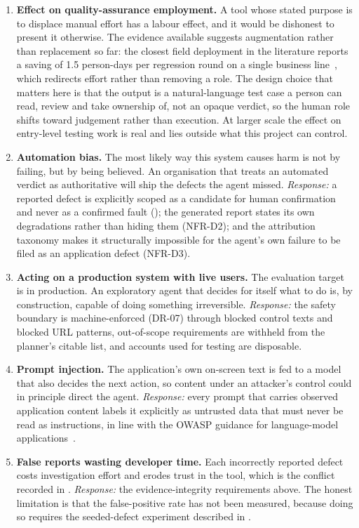 \begin{enumerate}[label=\textbf{N\arabic*.},leftmargin=3.0em]
  \item \textbf{Effect on quality-assurance employment.} A tool whose stated
    purpose is to displace manual effort has a labour effect, and it would be
    dishonest to present it otherwise. The evidence available suggests
    augmentation rather than replacement so far: the closest field deployment in
    the literature reports a saving of 1.5 person-days per regression round on a
    single business line~\cite{auitestagent}, which redirects effort rather than
    removing a role. The design choice that matters here is that the output is a
    natural-language test case a person can read, review and take ownership of,
    not an opaque verdict, so the human role shifts toward judgement rather than
    execution. At larger scale the effect on entry-level testing work is real
    and lies outside what this project can control.
  \item \textbf{Automation bias.} The most likely way this system causes harm is
    not by failing, but by being believed. An organisation that treats an
    automated verdict as authoritative will ship the defects the agent missed.
    \emph{Response:} a reported defect is explicitly scoped as a candidate for
    human confirmation and never as a confirmed fault ();
    the generated report states its own degradations rather than hiding them
    (NFR-D2); and the attribution taxonomy makes it structurally impossible for
    the agent's own failure to be filed as an application defect (NFR-D3).
  \item \textbf{Acting on a production system with live users.} The evaluation
    target is in production. An exploratory agent that decides for itself what
    to do is, by construction, capable of doing something irreversible.
    \emph{Response:} the safety boundary is machine-enforced (DR-07) through
    blocked control texts and blocked URL patterns, out-of-scope requirements are
    withheld from the planner's citable list, and accounts used for testing are
    disposable.
  \item \textbf{Prompt injection.} The application's own on-screen text is fed
    to a model that also decides the next action, so content under an attacker's
    control could in principle direct the agent.
    \emph{Response:} every prompt that carries observed application content
    labels it explicitly as untrusted data that must never be read as
    instructions, in line with the OWASP guidance for language-model
    applications~\cite{owaspllm}.
  \item \textbf{False reports wasting developer time.} Each incorrectly reported
    defect costs investigation effort and erodes trust in the tool, which is the
    conflict recorded in .
    \emph{Response:} the evidence-integrity requirements above. The honest
    limitation is that the false-positive rate has not been measured, because
    doing so requires the seeded-defect experiment described in
    .
\end{enumerate}

